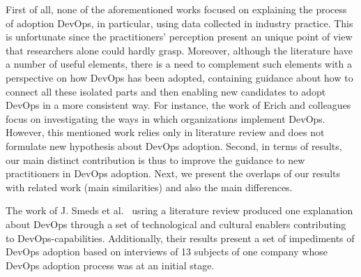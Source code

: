 

First of all, none of the aforementioned works focused on explaining the process of adoption DevOps,
in particular, using data collected in industry practice. This is unfortunate since the
practitioners' perception present an unique point of view that researchers
alone could hardly grasp. Moreover, although the literature have a number of
useful elements, there is a need to complement such elements with a perspective on how DevOps has
been adopted, containing guidance about how to connect all these isolated parts
and then enabling new candidates to adopt DevOps in a more consistent way. 
For instance, the work of Erich and colleagues~\cite{qualitative_devops_journalsw_17}
focus on investigating the ways in which organizations implement DevOps. 
However, this mentioned work relies only in literature review and does not formulate
new hypothesis about DevOps adoption. Second, 
in terms of results, our main distinct contribution is thus to improve the guidance
to new practitioners in DevOps adoption. 
Next, we present the overlaps of our
results with related work (main similarities) and also the main differences.

The work of J. Smeds et al.~\cite{devops_a_definition_xp_15} usring a literature
review produced one explanation about DevOps through a set of technological and
cultural enablers contributing to DevOps-capabilities. Additionally, their results 
present a set of impediments of DevOps adoption based on interviews of 13
subjects of one company whose DevOps adoption process was at an initial stage.

